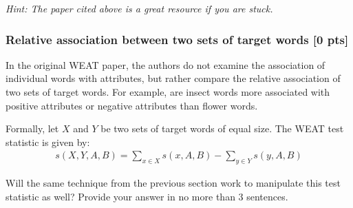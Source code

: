 \textit{Hint: The paper cited above is a great resource if you are stuck.}

\subsubsection{Relative association between two sets of target words [0 pts] \LIII}
In the original WEAT paper, the authors do not examine the association of individual words with attributes, but rather compare the relative association of two sets of target words. For example, are insect words more associated with positive attributes or negative attributes than flower words.

Formally, let \(X\) and \(Y\) be two sets of target words of equal size. The WEAT test statistic is given by:
\begin{align}
    s(X, Y, A, B) = \sum_{x\in X} s(x, A, B) - \sum_{y \in Y} s(y, A, B)
\end{align}

Will the same technique from the previous section work to manipulate this test statistic as well? Provide your answer in no more than 3 sentences.